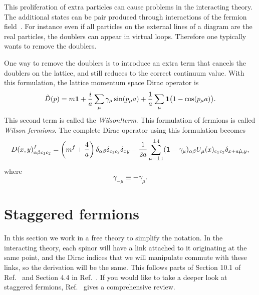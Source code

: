 This proliferation of extra particles can cause problems in the
interacting theory. The additional states can be pair produced
through interactions of the fermion field~\cite{montvay_quantum_1994}.
For instance even if all particles on the external lines of a diagram
are the real particles, the doublers can appear in virtual loops.
Therefore one typically wants to remove the doublers.

One way to remove the doublers is to introduce an extra term that
cancels the doublers on the lattice, and still reduces to the
correct continuum value. With this formulation, the lattice
momentum space Dirac operator is
\begin{equation}
  \tilde{D}(p)=m{\mathbf 1}+\frac{i}{a}\sum_\mu\gamma_\mu\sin(p_\mu a)
                   +\frac{1}{a}\sum_\mu{\mathbf 1}\big(1-\cos(p_\mu a)\big).
\end{equation} 
This second term is called the {\it Wilson!term}. This formulation
of fermions is called {\it Wilson fermions}. The complete Dirac
operator using this formulation becomes 
\begin{equation}
  D(x,y)^f_{\alpha\beta c_1c_2}
  =\left(m^f+\frac{4}{a}\right)\delta_{\alpha\beta}
                               \delta_{c_1c_2}
                               \delta_{xy}
   -\frac{1}{2a}\sum_{\mu=\pm 1}^{\pm 4}({\mathbf 1}-\gamma_\mu)_{\alpha\beta}
      U_\mu(x)_{c_1 c_2}\delta_{x+a\hat{\mu},y},
\end{equation}
where
\begin{equation}
  \gamma_{-\mu}\equiv-\gamma_{\mu}.
\end{equation}

\section{Staggered
fermions}\label{sec:stagg}

In this section we work in a free theory to simplify the notation.
In the interacting theory, each spinor will have a link attached to it
originating at the same point, and the Dirac indices that we will
manipulate commute with these links, so the derivation will be the same.
This follows parts of Section 10.1 of Ref.~\cite{gattringer_quantum_2010} 
and Section 4.4 in Ref.~\cite{rothe_lattice_2005}.
If you would like to take a deeper look at staggered fermions,
Ref.~\cite{Golterman:2024xos} gives a comprehensive review.

